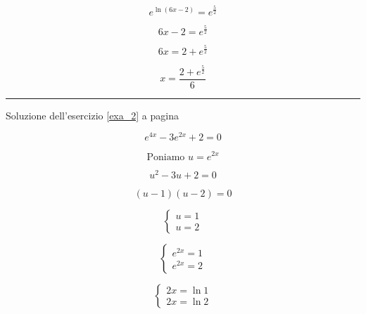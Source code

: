 \begin{equation*}
e^{\ln(6x - 2)} = e^{\frac{5}{2}}
\end{equation*}


\begin{equation*}
6x - 2 = e^{\frac{5}{2}}
\end{equation*}

\begin{equation*}
6x = 2+e^{\frac{5}{2}}
\end{equation*}


\begin{equation*}
x = \frac{2+e^{\frac{5}{2}}}{6}
\end{equation*}


\vspace{1cm}
\hrule
\vspace{1cm}

Soluzione dell'esercizio \ref{exa_2} a pagina \pageref{exa_2}\label{sola_2}

\begin{equation*}
e^{4x} - 3e^{2x} + 2 = 0
\end{equation*}


\begin{equation*}
\textrm{Poniamo }u=e^{2x}
\end{equation*}


\begin{equation*}
u^2-3u+2=0
\end{equation*}


\begin{equation*}
(u - 1)(u - 2) =0
\end{equation*}

\begin{equation*}
\left\{
\begin{array}{ll}
u=1 \\
u=2
\end{array}
\right.
\end{equation*}

\begin{equation*}
\left\{
\begin{array}{ll}
e^{2x}=1 \\
e^{2x}=2
\end{array}
\right.
\end{equation*}

\begin{equation*}
\left\{
\begin{array}{ll}
2x=\ln1 \\
2x=\ln2
\end{array}
\right.
\end{equation*}

